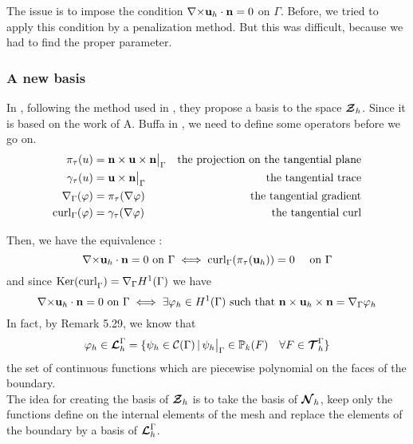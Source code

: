 The issue is to impose the condition
${\nabla\times}{\mathbf{u}}_h\cdot{\mathbf{n}}=0$ on $\Gamma$. Before, we tried to apply this
condition by a penalization method. But this was difficult, because we had to
find the proper parameter.\\

\subsubsection{A new basis}
\label{base}
In \cite{Venegas2013}, following the method used in
\cite{Meddahi2003,Salgado2005}, they propose a basis to the space ${\bm{\mathcal{Z}}}_h$.
Since it is based on the work of A. Buffa in \cite{Buffa2002845}, we need to
define some operators before we go on.
\begin{align*}
\pi_\tau(u) &= {\mathbf{n}}\times{\mathbf{u}}\times{\mathbf{n}}{\big\rvert_{\Gamma}} &\mbox{the projection on
  the tangential plane}\\
\gamma_\tau(u) &= {\mathbf{u}}\times{\mathbf{n}}{\big\rvert_{\Gamma}} &\mbox{the tangential
  trace}\\
{\nabla}_\Gamma(\varphi) &= \pi_\tau({\nabla}\varphi) &\mbox{the tangential gradient}\\
\mathrm{curl}_\Gamma(\varphi) &= \gamma_\tau({\nabla}\varphi) &\mbox{the tangential curl}
\end{align*}

Then, we have the equivalence :
\[ {\nabla\times}{\mathbf{u}}_h\cdot{\mathbf{n}}=0\mbox{ on }\Gamma \iff
\mathrm{curl}_\Gamma(\pi_\tau({\mathbf{u}}_h))=0\quad \mbox{ on } \Gamma \]
and since $\mathrm{Ker(curl}_\Gamma)={\nabla}_\Gamma H^1(\Gamma)$ we have 
\[ {\nabla\times}{\mathbf{u}}_h\cdot{\mathbf{n}}=0\mbox{ on }\Gamma \iff
\exists\varphi_h\in H^1(\Gamma) \mbox{ such that
}{\mathbf{n}}\times{\mathbf{u}}_h\times{\mathbf{n}} = {\nabla}_\Gamma\varphi_h \]
In fact, by \cite{Monk2003} Remark 5.29, we know that 
\[\varphi_h\in{\bm{\mathcal{L}}}_h^\Gamma = \{\psi_h\in\mathcal{C}(\Gamma) \,|\,
\psi_h{\big\rvert_{\Gamma}}\in{\mathbb{P}}_k(F) \quad \forall F\in{\bm{\mathcal{T}}}_h^\Gamma \}\]
the set of continuous functions which are piecewise polynomial on the faces of
the boundary.\\

The idea for creating the basis of ${\bm{\mathcal{Z}}}_h$ is to take the basis of ${\bm{\mathcal{N}}}_h$, keep
only the functions define on the internal elements of the mesh and replace the
elements of the boundary by a basis of ${\bm{\mathcal{L}}}_h^\Gamma$.\\

